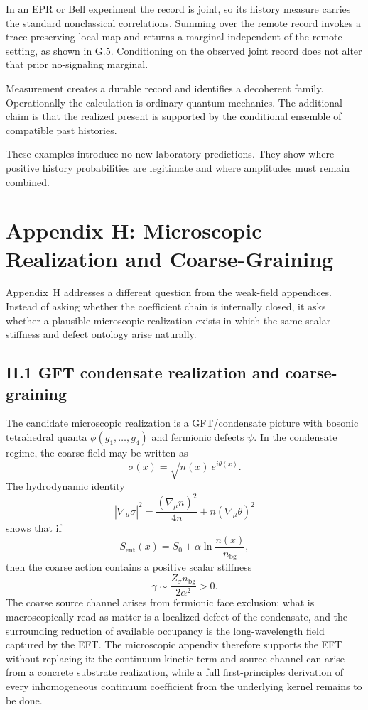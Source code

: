 \documentclass[11pt]{article}
\begin{document}
In an EPR or Bell experiment the record is joint, so its history measure carries the standard nonclassical correlations. Summing over the remote record invokes a trace-preserving local map and returns a marginal independent of the remote setting, as shown in G.5. Conditioning on the observed joint record does not alter that prior no-signaling marginal.

Measurement creates a durable record and identifies a decoherent family. Operationally the calculation is ordinary quantum mechanics. The additional claim is that the realized present is supported by the conditional ensemble of compatible past histories.

These examples introduce no new laboratory predictions. They show where positive history probabilities are legitimate and where amplitudes must remain combined.

\section*{Appendix H: Microscopic Realization and Coarse-Graining}

Appendix~H addresses a different question from the weak-field appendices. Instead of asking whether the coefficient chain is internally closed, it asks whether a plausible microscopic realization exists in which the same scalar stiffness and defect ontology arise naturally.

\subsection*{H.1 GFT condensate realization and coarse-graining}

The candidate microscopic realization is a GFT/condensate picture with bosonic tetrahedral quanta $\phi(g_1,\ldots,g_4)$ and fermionic defects $\psi$. In the condensate regime, the coarse field may be written as
\[
\sigma(x)=\sqrt{n(x)}\,e^{i\theta(x)}.
\]
The hydrodynamic identity
\[
|\nabla_\mu \sigma|^2
=
\frac{(\nabla_\mu n)^2}{4n}
+n(\nabla_\mu\theta)^2
\]
shows that if
\[
S_{\mathrm{ent}}(x)=S_0+\alpha \ln\!\frac{n(x)}{n_{\mathrm{bg}}},
\]
then the coarse action contains a positive scalar stiffness
\[
\gamma \sim \frac{Z_\sigma n_{\mathrm{bg}}}{2\alpha^2}>0.
\]
The coarse source channel arises from fermionic face exclusion: what is macroscopically read as matter is a localized defect of the condensate, and the surrounding reduction of available occupancy is the long-wavelength field captured by the EFT. The microscopic appendix therefore supports the EFT without replacing it: the continuum kinetic term and source channel can arise from a concrete substrate realization, while a full first-principles derivation of every inhomogeneous continuum coefficient from the underlying kernel remains to be done.
\end{document}
